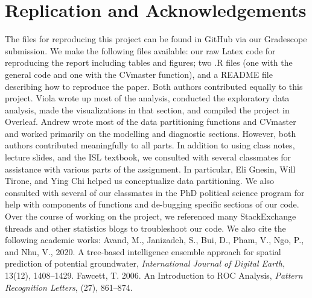 \documentclass[12pt]{article}
\begin{document}
\section{Replication and Acknowledgements}
The files for reproducing this project can be found in GitHub via our Gradescope submission. We make the following files available: our raw Latex code for reproducing the report including tables and figures; two .R files (one with the general code and one with the CVmaster function), and a README file describing how to reproduce the paper. 
\newline
\newline 
Both authors contributed equally to this project. Viola wrote up most of the analysis, conducted the exploratory data analysis, made the visualizations in that section, and compiled the project in Overleaf. Andrew wrote most of the data partitioning functions and CVmaster and worked primarily on the modelling and diagnostic sections.  However, both authors contributed meaningfully to all parts. In addition to using class notes, lecture slides, and the ISL textbook, we consulted with several classmates for assistance with various parts of the assignment. In particular, Eli Gnesin, Will Tirone, and Ying Chi helped us conceptualize data partitioning. We also consulted with several of our classmates in the PhD political science program for help with components of functions and de-bugging specific sections of our code. Over the course of working on the project, we referenced many StackExchange threads and other statistics blogs to troubleshoot our code. We also cite the following academic works: 
\newline
\newline
Avand, M., Janizadeh, S., Bui, D., Pham, V., Ngo, P., and Nhu, V., 2020. A tree-based intelligence ensemble approach for spatial prediction of potential groundwater, \textit{International Journal of Digital Earth}, 13(12), 1408--1429.
\newline
\newline
Fawcett, T. 2006. An Introduction to ROC Analysis, \textit{Pattern Recognition Letters}, (27), 861--874. 
\end{document}

